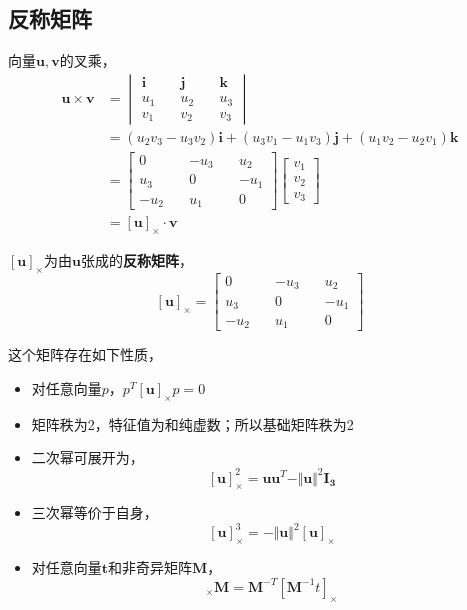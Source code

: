 \documentclass[hpyerref,UTF8,a4paper,titlepage,12pt,oneside]{ctexbook}
\theoremstyle{definition}
\begin{document}
\subsection{反称矩阵}
 	向量$\mathbf{u},\mathbf{v}$的叉乘，
 	\begin{align*}
 		\mathbf{u}\times \mathbf{v} &= 
 		\begin{vmatrix}
 			\mathbf{i}\quad & \mathbf{j}\quad & \mathbf{k}\\
 			u_1\quad& u_2\quad& u_3\\
 			v_1\quad& v_2\quad& v_3
 		\end{vmatrix}\\
 		&= (u_2v_3 -u_3v_2)\mathbf{i} + (u_3v_1 - u_1v_3)\mathbf{j} +(u_1v_2 - u_2v_1)\mathbf{k}\\
 		&=\begin{bmatrix}
 			0 \quad& -u_3\quad & u_2\\
 			u_3\quad & 0\quad& -u_1\\
 			-u_2\quad& u_1\quad& 0
 		\end{bmatrix}
 		\begin{bmatrix}
 			v_1\\
 			v_2\\
 			v_3
 		\end{bmatrix}
 		\\
 		&= [\mathbf{u}]_{\times} \cdot \mathbf{v}
 	\end{align*}

 	$[\mathbf{u}]_{\times}$为由$\mathbf{u}$张成的\textbf{反称矩阵}，
 	$$
 		[\mathbf{u}]_{\times} = 
 		\begin{bmatrix}
 			0 \quad& -u_3\quad & u_2\\
 			u_3\quad & 0\quad& -u_1\\
 			-u_2\quad& u_1\quad& 0
 		\end{bmatrix}
 	$$

	这个矩阵存在如下性质，

	\begin{itemize}
		\item 对任意向量$p$，$p^T [\mathbf{u}]_{\times} p = 0$
		\item 矩阵秩为2，特征值为和纯虚数；所以基础矩阵秩为2
		\item 二次幂可展开为，
			$$
				[\mathbf{u}]_{\times}^2 = \mathbf{u}\mathbf{u}^T - \Vert\mathbf{u}\Vert^2 \mathbf{I_3}
			$$
		\item 三次幂等价于自身，
			$$
				[\mathbf{u}]_{\times}^3 = -\Vert\mathbf{u}\Vert^2[\mathbf{u}]_{\times}
			$$
		\item 对任意向量$\mathbf{t}$和非奇异矩阵$\mathbf{M}$，
			\begin{equation}
				[\mathbf{t}]_{\times}\mathbf{M} = \mathbf{M}^{-T}\left[\mathbf{M}^{-1}t\right]_{\times} \label {inver_m_p}
			\end{equation}
	\end{itemize}




\end{document}
